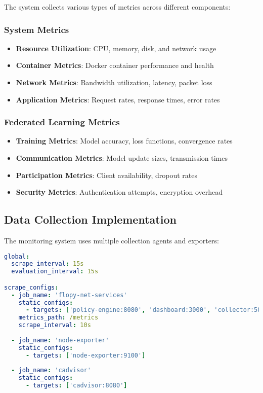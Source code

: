 The system collects various types of metrics across different components:

\subsubsection{System Metrics}
\begin{itemize}
    \item \textbf{Resource Utilization}: CPU, memory, disk, and network usage
    \item \textbf{Container Metrics}: Docker container performance and health
    \item \textbf{Network Metrics}: Bandwidth utilization, latency, packet loss
    \item \textbf{Application Metrics}: Request rates, response times, error rates
\end{itemize}

\subsubsection{Federated Learning Metrics}
\begin{itemize}
    \item \textbf{Training Metrics}: Model accuracy, loss functions, convergence rates
    \item \textbf{Communication Metrics}: Model update sizes, transmission times
    \item \textbf{Participation Metrics}: Client availability, dropout rates
    \item \textbf{Security Metrics}: Authentication attempts, encryption overhead
\end{itemize}

\subsection{Data Collection Implementation}

The monitoring system uses multiple collection agents and exporters:

\begin{lstlisting}[language=yaml, caption=Prometheus Configuration]
global:
  scrape_interval: 15s
  evaluation_interval: 15s

scrape_configs:
  - job_name: 'flopy-net-services'
    static_configs:
      - targets: ['policy-engine:8080', 'dashboard:3000', 'collector:5000']
    metrics_path: /metrics
    scrape_interval: 10s
    
  - job_name: 'node-exporter'
    static_configs:
      - targets: ['node-exporter:9100']
      
  - job_name: 'cadvisor'
    static_configs:
      - targets: ['cadvisor:8080']
\end{lstlisting}

